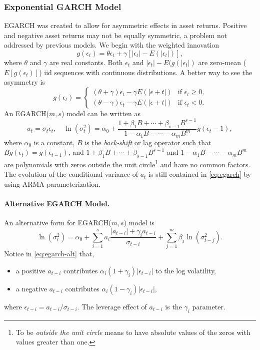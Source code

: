 \subsubsection{Exponential GARCH Model}
EGARCH was created to allow for asymmetric effects in asset returns. Positive and negative asset returns may not be equally symmetric, a problem not addressed by previous models. We begin with the weighted innovation
\[
g(\epsilon_t) = \theta \epsilon_t + \gamma \left[ |\epsilon_t| - E(|\epsilon_t|) \right],
\]
where $\theta$ and $\gamma$ are real constants. Both $\epsilon_t$ and $|\epsilon_t|-E(g(|\epsilon_t|)$ are zero-mean ($E[g(\epsilon_t)]$) iid sequences with continuous distributions. A better way to see the asymmetry is
\[
g(\epsilon_t) =
	\begin{cases}
	(\theta + \gamma)\epsilon_t - \gamma E(|\epsilon+t |) & \text{if $\epsilon_t \ge 0$,} \\
	(\theta - \gamma)\epsilon_t - \gamma E(|\epsilon+t |) & \text{if $\epsilon_t < 0$}.
	\end{cases}
\]
An EGARCH($m,s$) model can be written as
\begin{equation}
a_t = \sigma_t \epsilon_t, \quad \ln(\sigma^2_t)=\alpha_0 +
\frac{1+\beta_1 B+ \cdots +\beta_{s-1} B^{s-1}}{1-\alpha_1 B -\cdots -\alpha_m B^m} g(\epsilon_t - 1),
\label{eq:egarch}
\end{equation}
where $\alpha_0$ is a constant, $B$ is the \emph{back-shift} or lag operator such that $Bg(\epsilon_t)=g(\epsilon_{t-1})$, and $1+\beta_1 B +\cdots +\beta_{s-1} B^{s-1}$ and $1-\alpha_1 B -\cdots -\alpha_m B^m$ are polynomials with zeros outside the unit circle\footnote{To be \emph{outside the unit circle} means to have absolute values of the zeros with values greater than one.} and have no common factors. The evolution of the conditional variance of $a_t$ is still contained in \eqref{eq:egarch} by using ARMA parameterization.

\paragraph{Alternative EGARCH Model.} An alternative form for EGARCH($m,s$) model is
\begin{equation}
\ln(\sigma^2_t) = \alpha_0 + \sum^s_{i=1} a_i \frac{|a_{t-i}|+\gamma_i a_{t-i}}{\sigma_{t-i}} +
\sum^m_{j=1} \beta_j \ln(\sigma^2_{t-j}).
\label{eq:egarch-alt}
\end{equation}
Notice in \eqref{eq:egarch-alt} that,
\begin{itemize}
\item a positive $a_{t-i}$ contributes $\alpha_i(1+\gamma_i)|\epsilon_{t-i}|$ to the log volatility,
\item a negative $a_{t-i}$ contributes $\alpha_i(1-\gamma_i)|\epsilon_{t-i}|$,
\end{itemize}
where $\epsilon_{t-i}=a_{t-i}/\sigma_{t-i}$. The leverage effect of $a_{t-i}$ is the $\gamma_i$ parameter.

